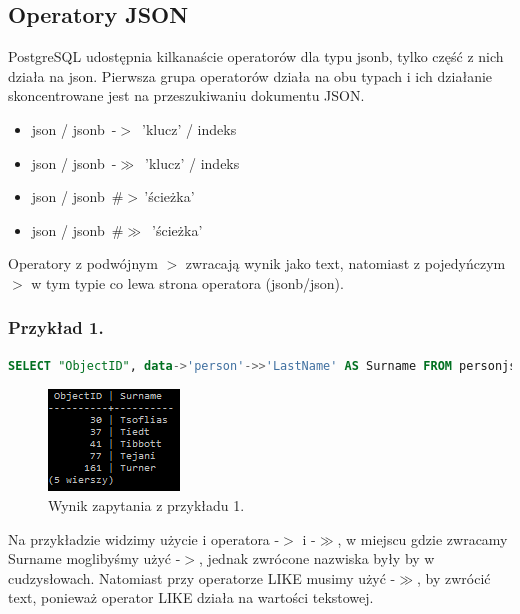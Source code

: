 \documentclass[a4paper,12pt,table]{article}
\begin{document}
{\subsection{Operatory JSON}
PostgreSQL udostępnia kilkanaście operatorów dla typu jsonb, tylko część z nich działa na json. Pierwsza grupa operatorów działa na obu typach i ich działanie skoncentrowane jest na przeszukiwaniu dokumentu JSON. 
\begin{itemize}
\item json / jsonb \,-$>$\, 'klucz' / indeks
\item json / jsonb\, -$\gg$\, 'klucz' / indeks
\item json / jsonb\, \#$> $\,'{ścieżka}'
\item json / jsonb\, \#$\gg$\, '{ścieżka}'
\end{itemize}
Operatory z podwójnym $>$ zwracają wynik jako text, natomiast z pojedyńczym $>$ w tym typie co lewa strona operatora (jsonb/json).


\subsubsection*{Przykład 1.}
\setlength{\intextsep}{15pt plus 2pt minus 2pt}
\begin{lstlisting}[language=SQL,basicstyle=\footnotesize]
SELECT "ObjectID", data->'person'->>'LastName' AS Surname FROM personjsonb WHERE data->'person'->>'LastName' LIKE 'T%' LIMIT 5;
\end{lstlisting}
\vspace{0.5cm}
\begin{figure}[h]
\begin{center}
\includegraphics[scale=1.1]{sc/1}
\end{center}
\caption{Wynik zapytania z przykładu 1.}
\end{figure}

Na przykładzie widzimy użycie i operatora -$>$ i -$\gg$, w miejscu gdzie zwracamy Surname moglibyśmy użyć -$>$, jednak zwrócone nazwiska były by w cudzysłowach. Natomiast przy operatorze LIKE musimy użyć -$\gg$, by zwrócić text, ponieważ operator LIKE działa na wartości tekstowej.
}
\end{document}
